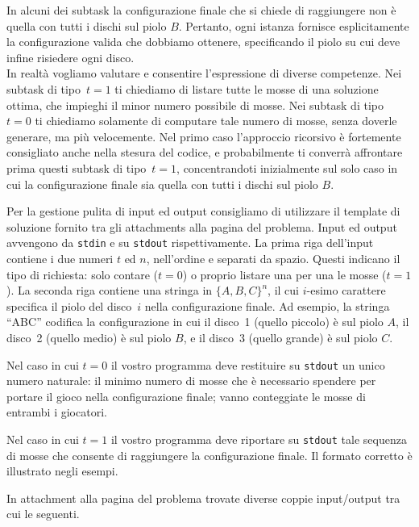 In alcuni dei subtask la configurazione finale che si chiede di raggiungere non è quella con tutti i dischi sul piolo $B$. Pertanto, ogni istanza fornisce esplicitamente la configurazione valida che dobbiamo ottenere, specificando il piolo su cui deve infine risiedere ogni disco.\\ 

In realtà vogliamo valutare e consentire l'espressione di diverse competenze. Nei subtask di tipo~$t=1$ ti chiediamo di listare tutte le mosse di una soluzione ottima, che impieghi il minor numero possibile di mosse.
Nei subtask di tipo~$t=0$ ti chiediamo solamente di computare tale numero di mosse, senza doverle generare, ma più velocemente.
Nel primo caso l'approccio ricorsivo è fortemente consigliato anche nella stesura del codice, e probabilmente ti converrà affrontare prima questi subtask di tipo~$t=1$, concentrandoti inizialmente sul solo caso in cui la configurazione finale sia quella con tutti i dischi sul piolo $B$.



Per la gestione pulita di input ed output consigliamo di utilizzare il template di soluzione fornito tra gli attachments alla pagina del problema.
Input ed output avvengono da \verb'stdin'
e su \verb'stdout' rispettivamente.
La prima riga dell'input contiene i due numeri $t$ ed $n$, nell'ordine e separati da spazio. Questi indicano il tipo di richiesta: solo contare ($t=0$) o proprio listare una per una le mosse ($t=1$).
La seconda riga contiene una stringa in $\{A,B,C\}^n$, il cui $i$-esimo carattere specifica il piolo del disco~$i$ nella configurazione finale. Ad esempio, la stringa ``ABC'' codifica la configurazione in cui il disco~1 (quello piccolo) è sul piolo $A$, il disco~2 (quello medio) è sul piolo $B$, e il disco~3 (quello grande) è sul piolo $C$. 

\indent
Nel caso in cui $t=0$ il vostro programma deve restituire su \verb'stdout' un unico numero naturale: il minimo numero di mosse che è necessario spendere per portare il gioco nella configurazione finale; vanno conteggiate le mosse di entrambi i giocatori.

\indent
Nel caso in cui $t= 1$
il vostro programma deve riportare su \verb'stdout' tale sequenza di mosse che consente di raggiungere la configurazione finale. Il formato corretto è illustrato negli esempi.



In attachment alla pagina del problema trovate diverse coppie input/output tra cui le seguenti.



